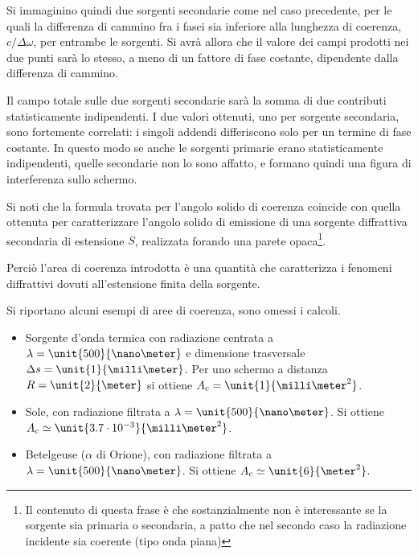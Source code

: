Si immaginino quindi due sorgenti secondarie come nel caso precedente, per le quali la differenza di cammino fra i fasci sia inferiore alla lunghezza di coerenza, $ c/\Delta\omega $, per entrambe le sorgenti. Si avrà allora che il valore dei campi prodotti nei due punti sarà lo stesso, a meno di un fattore di fase costante, dipendente dalla differenza di cammino.

Il campo totale sulle due sorgenti secondarie sarà la somma di due contributi statisticamente indipendenti. I due valori ottenuti, uno per sorgente secondaria, sono fortemente correlati: i singoli addendi differiscono solo per un termine di fase costante. In questo modo se anche le sorgenti primarie erano statisticamente indipendenti, quelle secondarie non lo sono affatto, e formano quindi una figura di interferenza sullo schermo.

\begin{oss}[Diffrazione]
	Si noti che la formula trovata per l'angolo solido di coerenza coincide con quella ottenuta per caratterizzare l'angolo solido di emissione di una sorgente diffrattiva secondaria di estensione $ S $, realizzata forando una parete opaca\footnote{Il contenuto di questa frase è che sostanzialmente non è interessante se la sorgente sia primaria o secondaria, a patto che nel secondo caso la radiazione incidente sia coerente (tipo onda piana)}.
	
	Perciò l'area di coerenza introdotta è una quantità che caratterizza i fenomeni diffrattivi dovuti all'estensione finita della sorgente.
\end{oss}

\begin{es}
	Si riportano alcuni esempi di aree di coerenza, sono omessi i calcoli.
	\begin{itemize}
		\item Sorgente d'onda termica con radiazione centrata a $ \lambda = \unit{500}{\nano\meter} $ e dimensione trasversale $ \Delta s = \unit{1}{\milli\meter} $. Per uno schermo a distanza $ R = \unit{2}{\meter} $ si ottiene $ A_c = \unit{1}{\milli\meter^2} $.
		\item Sole, con radiazione filtrata a $ \lambda = \unit{500}{\nano\meter} $. Si ottiene $ A_c \simeq \unit{3.7 \cdot 10^{-3}}{\milli\meter^2} $.
		\item Betelgeuse ($ \alpha $ di Orione), con radiazione filtrata a $ \lambda = \unit{500}{\nano\meter} $. Si ottiene $ A_c \simeq \unit{6}{\meter^2} $.
	\end{itemize}
\end{es}

